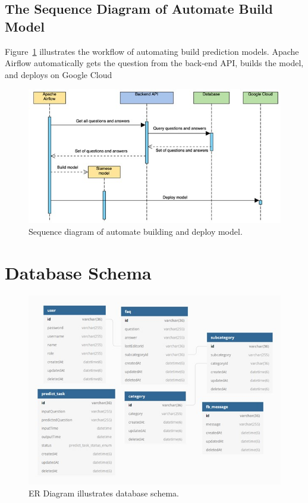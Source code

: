 \documentclass[12pt,oneside,openright,a4paper]{cpe-english-project}
\begin{document}
\pagebreak

\subsection{The Sequence Diagram of Automate Build Model}
Figure~\ref*{fig:Sequence diagram of automate building and deploy model.} illustrates the workflow of automating build prediction models. Apache Airflow automatically gets the question from the back-end API, builds the model, and deploys on Google Cloud
\begin{figure}[!h]
	\includegraphics[width=14cm]{img/ch3/sequence diagram of automate build model.jpg}
	\caption{Sequence diagram of automate building and deploy model.}\label{fig:Sequence diagram of automate building and deploy model.}
\end{figure}

\section{Database Schema}
\begin{figure}[!h]
	\includegraphics[width=14cm]{img/ch3/Database Schema.jpg}
	\caption{ER Diagram illustrates database schema.}\label{fig:ER Diagram illustrates database schema.}
\end{figure}
\end{document}

